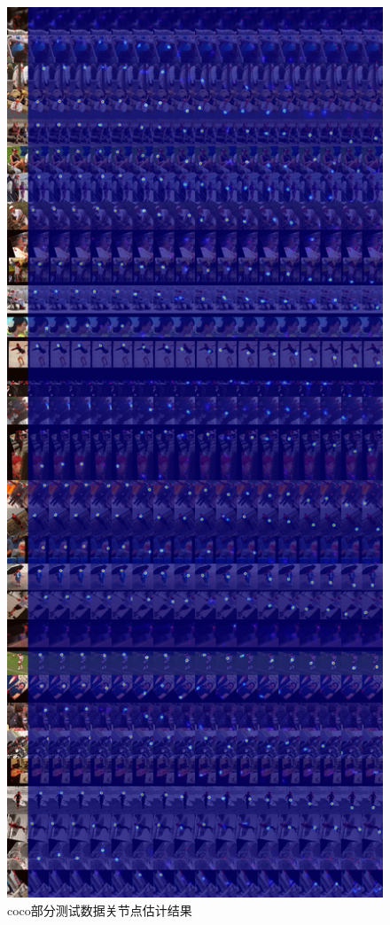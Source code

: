 \begin{figure}[h]
	\centering
	\includegraphics[scale=0.4]{figures/22.jpg}
	\caption{coco部分测试数据关节点估计结果}
	\label{fig:f22}
\end{figure}

